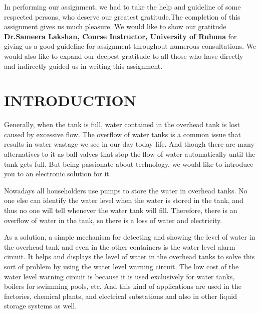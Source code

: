 \documentclass[12pt,a4paper,oneside]{book}
\theoremstyle{plain}
\numberwithin{equation}{chapter} \DeclareMathOperator{\Var}{Var}
\renewcommand{\contentsname}{\hfill\bfseries\Large TABLE OF CONTENTS \hfill}
\begin{document}
In performing our assignment, we had to take the help and guideline of some respected persons, who deserve our greatest gratitude.The completion of this assignment gives us much pleasure. We would like to show our gratitude \textbf{Dr.Sameera Lakshan, Course Instructor, University of Ruhuna}  for giving us a good guideline for assignment throughout numerous consultations. We would also like to expand our deepest gratitude to all those who have directly and indirectly guided us in writing this assignment.
 




\newpage

\tableofcontents
%


\newpage
{}
\listoffigures

\newpage
{}
\listoftables


\newpage
{}
\chapter{INTRODUCTION}
Generally, when the tank is full, water contained in the overhead tank is lost caused by excessive flow. The overflow of water tanks is a common issue that results in water wastage we see in our day today life. And though there are many alternatives to it as ball valves that stop the flow of water automatically until the tank gets full. But being passionate about technology, we would like to introduce you to an electronic solution for it.

Nowadays all householders use pumps to store the water in overhead tanks. No one else can identify the water level when the water is stored in the tank, and thus no one will tell whenever the water tank will fill. Therefore, there is an overflow of water in the tank, so there is a loss of water and electricity.

As a solution, a simple mechanism for detecting and showing the level of water in the overhead tank and even in the other containers is the water level alarm circuit. It helps and displays the level of water in the overhead tanks to solve this sort of problem by using the water level warning circuit. The low cost of the water level warning circuit is because it is used exclusively for water tanks, boilers for swimming pools, etc.  And this kind of applications are used in the factories, chemical plants, and electrical substations and also in other liquid storage systems as well.
\end{document}
